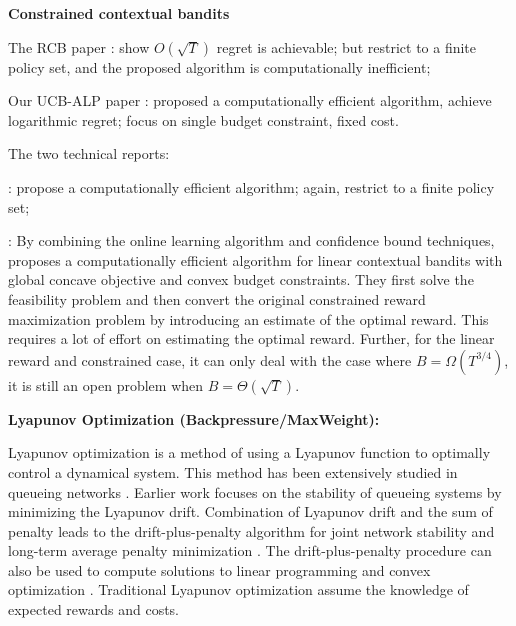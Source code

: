 \textbf{Constrained contextual bandits}

The RCB paper \cite{Badanidiyuru2014COLT}: show $O(\sqrt{T})$ regret is achievable; but restrict to a finite policy set, and the proposed algorithm is computationally inefficient;

Our UCB-ALP paper \cite{Wu2015NIPS:CCB}: proposed a computationally efficient algorithm, achieve logarithmic regret; focus on single budget constraint, fixed cost.

The two technical reports:

 \cite{Agrawal2015TR:CB}: propose a computationally efficient algorithm; again, restrict to a finite policy set;

\cite{Agrawal2015TR:LCB}: By combining the online learning algorithm and confidence bound techniques, \cite{Agrawal2015TR:LCB} proposes a computationally efficient algorithm for linear contextual bandits with global concave objective and convex budget constraints. They first solve the feasibility  problem and then convert the original constrained reward maximization problem by introducing an estimate of the optimal reward. This requires a lot of effort on estimating the optimal reward. Further, for the linear reward and constrained case, it can only deal with the case where $B = \Omega(T^{3/4})$, it is still an open problem when $B = \Theta(\sqrt{T})$.

\textbf{Lyapunov Optimization (Backpressure/MaxWeight):}

Lyapunov optimization is a method of using a Lyapunov function to optimally control a dynamical system. This method has been extensively studied in queueing networks \cite{??}.
Earlier work focuses on the stability of queueing systems by minimizing the Lyapunov drift.
Combination of Lyapunov drift and the sum of penalty leads to the drift-plus-penalty algorithm for joint network stability and long-term average penalty minimization \cite{}. The drift-plus-penalty procedure can also be used to compute solutions to linear programming and convex optimization \cite{}. Traditional Lyapunov optimization assume the knowledge of expected rewards and costs.


